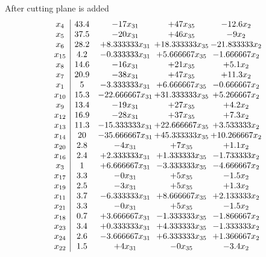 \documentclass[11pt]{article}
\begin{document}
 After cutting plane is added 
\[\begin{array}{c| c c@{\hskip 2pt} c@{\hskip 2pt} c@{\hskip 2pt} }
 x_{4}   &  43.4 & -17 x_{31} & + 47 x_{35} & -12.6 x_{2}\\
 x_{5}   &  37.5 & -20 x_{31} & + 46 x_{35} & -9 x_{2}\\
 x_{6}   &  28.2 & + 8.333333 x_{31} & + 18.333333 x_{35} & -21.833333 x_{2}\\
 x_{15}   &  4.2 & -0.333333 x_{31} & + 5.666667 x_{35} & -1.666667 x_{2}\\
 x_{8}   &  14.6 & -16 x_{31} & + 21 x_{35} & + 5.1 x_{2}\\
 x_{7}   &  20.9 & -38 x_{31} & + 47 x_{35} & + 11.3 x_{2}\\
 x_{1}   &  5 & -3.333333 x_{31} & + 6.666667 x_{35} & -0.666667 x_{2}\\
 x_{10}   &  15.3 & -22.666667 x_{31} & + 31.333333 x_{35} & + 5.266667 x_{2}\\
 x_{9}   &  13.4 & -19 x_{31} & + 27 x_{35} & + 4.2 x_{2}\\
 x_{12}   &  16.9 & -28 x_{31} & + 37 x_{35} & + 7.3 x_{2}\\
 x_{13}   &  11.3 & -15.333333 x_{31} & + 22.666667 x_{35} & + 3.533333 x_{2}\\
 x_{14}   &  20 & -35.666667 x_{31} & + 45.333333 x_{35} & + 10.266667 x_{2}\\
 x_{20}   &  2.8 & -4 x_{31} & + 7 x_{35} & + 1.1 x_{2}\\
 x_{16}   &  2.4 & + 2.333333 x_{31} & + 1.333333 x_{35} & -1.733333 x_{2}\\
 x_{3}   &  1 & + 6.666667 x_{31} & -3.333333 x_{35} & -4.666667 x_{2}\\
 x_{17}   &  3.3 & -0 x_{31} & + 5 x_{35} & -1.5 x_{2}\\
 x_{19}   &  2.5 & -3 x_{31} & + 5 x_{35} & + 1.3 x_{2}\\
 x_{11}   &  3.7 & -6.333333 x_{31} & + 8.666667 x_{35} & + 2.133333 x_{2}\\
 x_{21}   &  3.3 & -0 x_{31} & + 5 x_{35} & -1.5 x_{2}\\
 x_{18}   &  0.7 & + 3.666667 x_{31} & -1.333333 x_{35} & -1.866667 x_{2}\\
 x_{23}   &  3.4 & + 0.333333 x_{31} & + 4.333333 x_{35} & -1.333333 x_{2}\\
 x_{24}   &  2.6 & -3.666667 x_{31} & + 6.333333 x_{35} & + 1.366667 x_{2}\\
 x_{22}   &  1.5 & + 4 x_{31} & -0 x_{35} & -3.4 x_{2}\\

\end{array}\]
\end{document}
